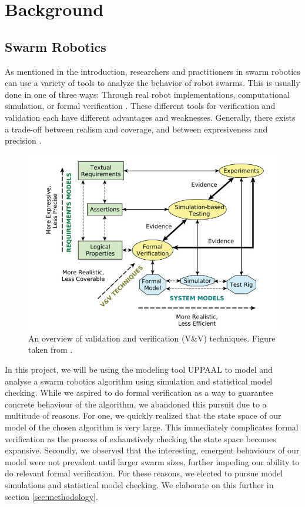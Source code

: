 \section{Background}
\subsection{Swarm Robotics}
As mentioned in the introduction, researchers and practitioners in swarm robotics can use a variety of tools to analyze the behavior of robot swarms. This is usually done in one of three ways: Through real robot implementations, computational simulation, or formal verification \parencite{FisherSwarm2010Original}. These different tools for verification and validation each have different advantages and weaknesses. Generally, there exists a trade-off between realism and coverage, and between expresiveness and precision \parencite{VandVpaper}.
\begin{figure}[H]
    \centering
    \includegraphics[width=0.8\linewidth]{pictures/FisherFigure.png}
    \caption{An overview of validation and verification (V\&V) techniques. Figure taken from \cite{VandVpaper}.}
    \label{fig:ConsensusGroupsFromArticle}
\end{figure}
In this project, we will be using the modeling tool UPPAAL to model and analyse a swarm robotics algorithm using simulation and statistical model checking. While we aspired to do formal verification as a way to guarantee concrete behaviour of the algorithm, we abandoned this pursuit due to a multitude of reasons. For one, we quickly realized that the state space of our model of the chosen algorithm is very large. This immediately complicates formal verification as the process of exhaustively checking the state space becomes expansive. Secondly, we observed that the interesting, emergent behaviours of our model were not prevalent until larger swarm sizes, further impeding our ability to do relevant formal verification. For these reasons, we elected to pursue model simulations and statistical model checking. We elaborate on this further in section \ref{sec:methodology}.

